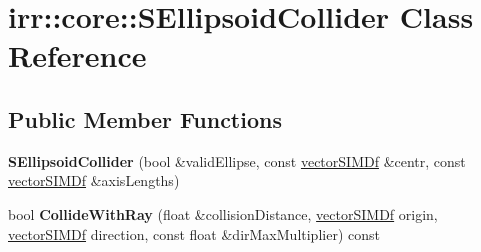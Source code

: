 \hypertarget{classirr_1_1core_1_1SEllipsoidCollider}{}\section{irr\+:\+:core\+:\+:S\+Ellipsoid\+Collider Class Reference}
\label{classirr_1_1core_1_1SEllipsoidCollider}
\subsection*{Public Member Functions}
\begin{DoxyCompactItemize}
\item 
{\bfseries S\+Ellipsoid\+Collider} (bool \&valid\+Ellipse, const \hyperlink{classirr_1_1core_1_1vectorSIMDf}{vector\+S\+I\+M\+Df} \&centr, const \hyperlink{classirr_1_1core_1_1vectorSIMDf}{vector\+S\+I\+M\+Df} \&axis\+Lengths)\hypertarget{classirr_1_1core_1_1SEllipsoidCollider_af1907ea9fa417a2c4948ca0e64913847}{}\label{classirr_1_1core_1_1SEllipsoidCollider_af1907ea9fa417a2c4948ca0e64913847}

\item 
bool {\bfseries Collide\+With\+Ray} (float \&collision\+Distance, \hyperlink{classirr_1_1core_1_1vectorSIMDf}{vector\+S\+I\+M\+Df} origin, \hyperlink{classirr_1_1core_1_1vectorSIMDf}{vector\+S\+I\+M\+Df} direction, const float \&dir\+Max\+Multiplier) const \hypertarget{classirr_1_1core_1_1SEllipsoidCollider_ae31d5020fafb201fb5a17ad7f3aa7388}{}\label{classirr_1_1core_1_1SEllipsoidCollider_ae31d5020fafb201fb5a17ad7f3aa7388}

\end{DoxyCompactItemize}
